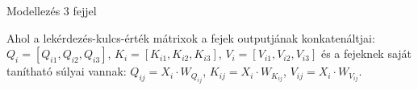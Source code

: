 \documentclass[english, aspectratio=169]{beamer}
\begin{document}
\begin{frame}{Modellezés 3 fejjel}
{\begin{center}
\end{center}}
Ahol a lekérdezés-kulcs-érték mátrixok a fejek outputjának konkatenáltjai: $Q_i = \left[ Q_{i1}, Q_{i2}, Q_{i3} \right]$, $K_i = \left[ K_{i1}, K_{i2}, K_{i3} \right]$, $V_i = \left[ V_{i1}, V_{i2}, V_{i3} \right]$ és a fejeknek saját tanítható súlyai vannak: $Q_{ij} = X_i \cdot W_{Q_{ij}}$, $K_{ij} = X_i \cdot W_{K_{ij}}$, $V_{ij} = X_i \cdot W_{V_{ij}}$.
\end{frame}
\end{document}
